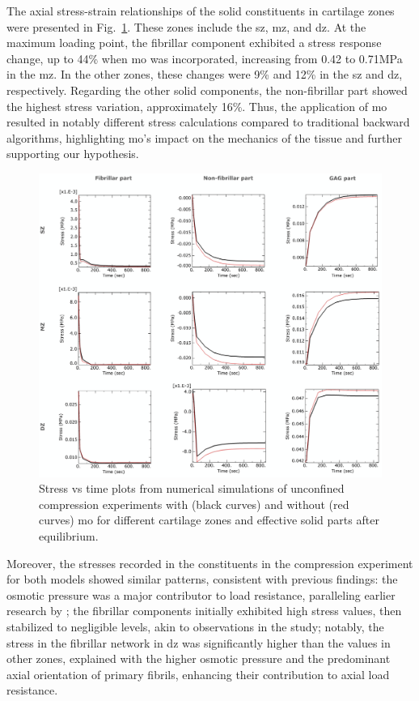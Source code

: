The axial stress-strain relationships of the solid constituents in cartilage zones were presented in Fig.~\ref{fig:parts_stress_strain}. These zones include the \ac{sz}, \ac{mz}, and \ac{dz}. At the maximum loading point, the fibrillar component exhibited a stress response change, up to 44\% when mo was incorporated, increasing from 0.42 to 0.71MPa in the \ac{mz}. In the other zones, these changes were 9\% and 12\% in the \ac{sz} and \ac{dz}, respectively. Regarding the other solid components, the non-fibrillar part showed the highest stress variation, approximately 16\%. Thus, the application of \ac{mo} resulted in notably different stress calculations compared to traditional backward algorithms, highlighting \ac{mo}'s impact on the mechanics of the tissue and further supporting our hypothesis.
%
\begin{figure}\centering
\includegraphics[width=\textwidth]{img/parts_stress_strain.jpg}
\caption{Stress vs time plots from numerical simulations of unconfined compression experiments with (black curves) and without (red curves) \ac{mo} for different cartilage zones and effective solid parts after equilibrium.}
\label{fig:parts_stress_strain}
\end{figure}

Moreover, the stresses recorded in the constituents in the compression experiment for both models showed similar patterns, consistent with previous findings: the osmotic pressure was a major contributor to load resistance, paralleling earlier research by \cite{quiroga2017}; the fibrillar components initially exhibited high stress values, then stabilized to negligible levels, akin to observations in the \cite{wilson2007} study; notably, the stress in the fibrillar network in \ac{dz} was significantly higher than the values in other zones, explained with the higher osmotic pressure and the predominant axial orientation of primary fibrils, enhancing their contribution to axial load resistance.

